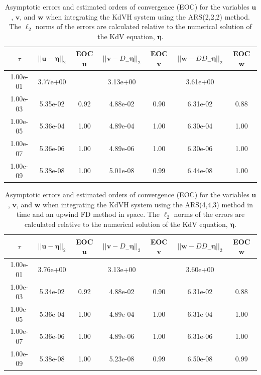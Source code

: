 \documentclass{article}
\newcommand{\ukdv}{\eta}
\begin{document}
\begin{table}[htbp]
\centering
\caption{Asymptotic errors and estimated orders of convergence (EOC) for the variables $\pmb{u}$, $\pmb{v}$,
 and $\pmb{w}$ when integrating the KdVH system using the ARS(2,2,2) method. The $\ell_2$ norms
  of the errors are calculated relative to the numerical solution of the KdV equation, $\pmb{\ukdv}$.}
\label{Table:ARS222_errors_num}
\begin{tabular}{ccccccc}
  \hline
  \hline
  \multicolumn{1}{c}{$\tau$} &
  \multicolumn{1}{c}{$||\pmb{u}-\pmb{\ukdv}||_2$} &
  \multicolumn{1}{c}{EOC $\pmb{u}$} &
  \multicolumn{1}{c}{$||\pmb{v}-D_- \pmb{\ukdv}||_2$} &
  \multicolumn{1}{c}{EOC $\pmb{v}$} &
  \multicolumn{1}{c}{$||\pmb{w}-D D_- \pmb{\ukdv}||_2$} &
  \multicolumn{1}{c}{EOC $\pmb{w}$} \\\hline
  1.00e-01 & 3.77e+00 &  & 3.13e+00 &  & 3.61e+00 &  \\
  1.00e-03 & 5.35e-02 & 0.92 & 4.88e-02 & 0.90 & 6.31e-02 & 0.88 \\
  1.00e-05 & 5.36e-04 & 1.00 & 4.89e-04 & 1.00 & 6.30e-04 & 1.00 \\
  1.00e-07 & 5.36e-06 & 1.00 & 4.89e-06 & 1.00 & 6.30e-06 & 1.00 \\
  1.00e-09 & 5.38e-08 & 1.00 & 5.01e-08 & 0.99 & 6.44e-08 & 1.00 \\
\end{tabular}
\end{table}

\begin{table}[htbp]
\centering
\caption{Asymptotic errors and estimated orders of convergence (EOC) for the variables $\pmb{u}$, $\pmb{v}$,
 and $\pmb{w}$ when integrating the KdVH system using the ARS(4,4,3) method
 in time and an upwind FD method in space. The $\ell_2$ norms
  of the errors are calculated relative to the numerical solution of the KdV equation, $\pmb{\ukdv}$.}
\label{Table:ARS443_errors_num}
\begin{tabular}{ccccccc}
  \hline
  \hline
  \multicolumn{1}{c}{$\tau$} &
  \multicolumn{1}{c}{$||\pmb{u}-\pmb{\ukdv}||_2$} &
  \multicolumn{1}{c}{EOC $\pmb{u}$} &
  \multicolumn{1}{c}{$||\pmb{v}-D_- \pmb{\ukdv}||_2$} &
  \multicolumn{1}{c}{EOC $\pmb{v}$} &
  \multicolumn{1}{c}{$||\pmb{w}-D D_- \pmb{\ukdv}||_2$} &
  \multicolumn{1}{c}{EOC $\pmb{w}$} \\\hline
  1.00e-01 & 3.76e+00 &  & 3.13e+00 &  & 3.60e+00 &  \\
  1.00e-03 & 5.34e-02 & 0.92 & 4.88e-02 & 0.90 & 6.31e-02 & 0.88 \\
  1.00e-05 & 5.36e-04 & 1.00 & 4.89e-04 & 1.00 & 6.31e-04 & 1.00 \\
  1.00e-07 & 5.36e-06 & 1.00 & 4.89e-06 & 1.00 & 6.31e-06 & 1.00 \\
  1.00e-09 & 5.38e-08 & 1.00 & 5.23e-08 & 0.99 & 6.50e-08 & 0.99 \\
\end{tabular}
\end{table}
\end{document}
